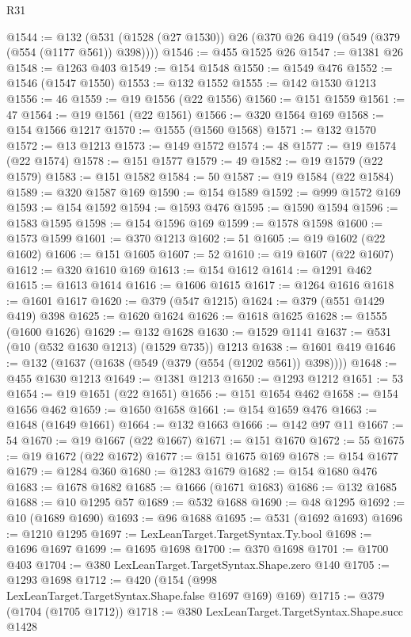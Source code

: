 \begin{lexlean}{R31}
\begin{coremodule}
@1544 := @132 (@531 (@1528 (@27 @1530)) @26 (@370 @26 @419 (@549 (@379 (@554 (@1177 @561)) @398))))
@1546 := @455 @1525 @26
@1547 := @1381 @26
@1548 := @1263 @403
@1549 := @154 @1548
@1550 := @1549 @476
@1552 := @1546 (@1547 @1550)
@1553 := @132 @1552
@1555 := @142 @1530 @1213
@1556 := 46
@1559 := @19 @1556 (@22 @1556)
@1560 := @151 @1559
@1561 := 47
@1564 := @19 @1561 (@22 @1561)
@1566 := @320 @1564 @169
@1568 := @154 @1566 @1217
@1570 := @1555 (@1560 @1568)
@1571 := @132 @1570
@1572 := @13 @1213
@1573 := @149 @1572
@1574 := 48
@1577 := @19 @1574 (@22 @1574)
@1578 := @151 @1577
@1579 := 49
@1582 := @19 @1579 (@22 @1579)
@1583 := @151 @1582
@1584 := 50
@1587 := @19 @1584 (@22 @1584)
@1589 := @320 @1587 @169
@1590 := @154 @1589
@1592 := @999 @1572 @169
@1593 := @154 @1592
@1594 := @1593 @476
@1595 := @1590 @1594
@1596 := @1583 @1595
@1598 := @154 @1596 @169
@1599 := @1578 @1598
@1600 := @1573 @1599
@1601 := @370 @1213
@1602 := 51
@1605 := @19 @1602 (@22 @1602)
@1606 := @151 @1605
@1607 := 52
@1610 := @19 @1607 (@22 @1607)
@1612 := @320 @1610 @169
@1613 := @154 @1612
@1614 := @1291 @462
@1615 := @1613 @1614
@1616 := @1606 @1615
@1617 := @1264 @1616
@1618 := @1601 @1617
@1620 := @379 (@547 @1215)
@1624 := @379 (@551 @1429 @419) @398
@1625 := @1620 @1624
@1626 := @1618 @1625
@1628 := @1555 (@1600 @1626)
@1629 := @132 @1628
@1630 := @1529 @1141
@1637 := @531 (@10 (@532 @1630 @1213) (@1529 @735)) @1213
@1638 := @1601 @419
@1646 := @132 (@1637 (@1638 (@549 (@379 (@554 (@1202 @561)) @398))))
@1648 := @455 @1630 @1213
@1649 := @1381 @1213
@1650 := @1293 @1212
@1651 := 53
@1654 := @19 @1651 (@22 @1651)
@1656 := @151 @1654 @462
@1658 := @154 @1656 @462
@1659 := @1650 @1658
@1661 := @154 @1659 @476
@1663 := @1648 (@1649 @1661)
@1664 := @132 @1663
@1666 := @142 @97 @11
@1667 := 54
@1670 := @19 @1667 (@22 @1667)
@1671 := @151 @1670
@1672 := 55
@1675 := @19 @1672 (@22 @1672)
@1677 := @151 @1675 @169
@1678 := @154 @1677
@1679 := @1284 @360
@1680 := @1283 @1679
@1682 := @154 @1680 @476
@1683 := @1678 @1682
@1685 := @1666 (@1671 @1683)
@1686 := @132 @1685
@1688 := @10 @1295 @57
@1689 := @532 @1688
@1690 := @48 @1295
@1692 := @10 (@1689 @1690)
@1693 := @96 @1688
@1695 := @531 (@1692 @1693)
@1696 := @1210 @1295
@1697 := LexLeanTarget.TargetSyntax.Ty.bool
@1698 := @1696 @1697
@1699 := @1695 @1698
@1700 := @370 @1698
@1701 := @1700 @403
@1704 := @380 LexLeanTarget.TargetSyntax.Shape.zero @140
@1705 := @1293 @1698
@1712 := @420 (@154 (@998 LexLeanTarget.TargetSyntax.Shape.false @1697 @169) @169)
@1715 := @379 (@1704 (@1705 @1712))
@1718 := @380 LexLeanTarget.TargetSyntax.Shape.succ @1428

\end{coremodule}
\end{lexlean}

